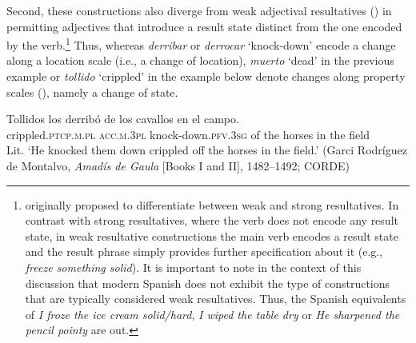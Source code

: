 \documentclass[output=paper,colorlinks,citecolor=brown,
]{langscibook}
\begin{document}

Second, these constructions also diverge from weak adjectival resultatives (\citealt{Washio1997}) in permitting adjectives that introduce a result state distinct from the one encoded by the verb.\footnote{\citet{Washio1997} originally proposed to differentiate between weak and strong resultatives. In contrast with strong resultatives, where the verb does not encode any result state, in weak resultative constructions the main verb encodes a result state and the result phrase simply provides further specification about it (e.g., \textit{freeze something solid}). It is important to note in the context of this discussion that modern Spanish does not exhibit the type of constructions that are typically considered weak resultatives. Thus, the Spanish equivalents of \textit{I froze the ice cream solid/hard}, \textit{I wiped the table dry} or \textit{He sharpened the pencil pointy} are out.} Thus, whereas \textit{derribar} or \textit{derrocar}
`knock-down’ encode a change along a location scale (i.e., a change of location), \textit{muerto} `dead’ in the previous example or \textit{tollido} `crippled' in the example below denote changes along property scales (\citealt{Beavers2011}), namely a change of state.

\ea
  \gll Tollidos los derribó de los cavallos en el campo.\\
crippled.\textsc{ptcp}.\textsc{m}.\textsc{pl} \textsc{acc}.\textsc{m}.\textsc{3pl} knock-down.\textsc{pfv}.\textsc{3sg} of the horses in the field\\
  \glt Lit. `He knocked them down crippled off the horses in the field.' (Garci Rodríguez de Montalvo, \textit{Amadís de Gaula} [Books I and II], 1482--1492; CORDE)
\z 

\end{document}
